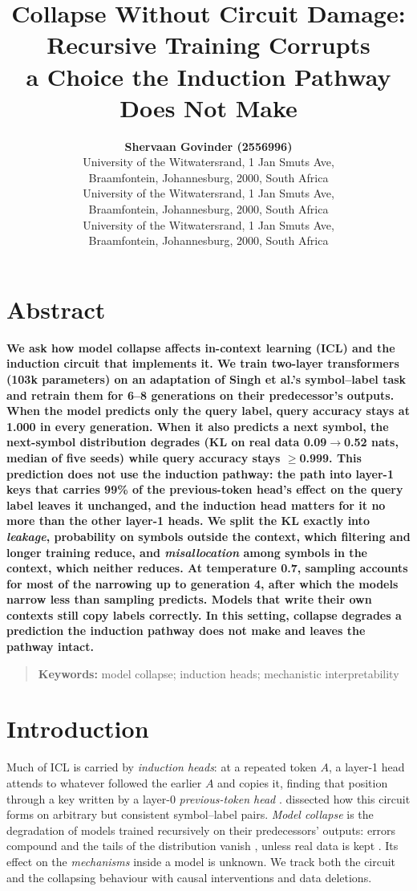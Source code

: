 \documentclass[10pt,letterpaper]{article}
\title{Collapse Without Circuit Damage: Recursive Training Corrupts\\a Choice the Induction Pathway Does Not Make}
\author{{\large \bf Shervaan Govinder (2556996)} \\ University of the Witwatersrand, 1 Jan Smuts Ave,\\ Braamfontein, Johannesburg, 2000, South Africa
  \AND {\large \bf Jaishil Patel (2602867)} \\ University of the Witwatersrand, 1 Jan Smuts Ave,\\ Braamfontein, Johannesburg, 2000, South Africa
  \AND {\large \bf Kovendan Jason Raman (2566527)} \\ University of the Witwatersrand, 1 Jan Smuts Ave,\\ Braamfontein, Johannesburg, 2000, South Africa}
\begin{document}
\maketitle
\phantom{.}
\newpage
\phantom{.}
\newpage
\section{Abstract}
{
\bf
{}
We ask how model collapse affects in-context learning (ICL) and the induction circuit that implements it. We train two-layer transformers (103k parameters) on an adaptation of Singh et al.'s symbol--label task and retrain them for 6--8 generations on their predecessor's outputs. When the model predicts only the query label, query accuracy stays at 1.000 in every generation. When it also predicts a next symbol, the next-symbol distribution degrades (KL on real data 0.09$\to$0.52 nats, median of five seeds) while query accuracy stays $\geq$0.999. This prediction does not use the induction pathway: the path into layer-1 keys that carries 99\% of the previous-token head's effect on the query label leaves it unchanged, and the induction head matters for it no more than the other layer-1 heads. We split the KL exactly into \emph{leakage}, probability on symbols outside the context, which filtering and longer training reduce, and \emph{misallocation} among symbols in the context, which neither reduces. At temperature 0.7, sampling accounts for most of the narrowing up to generation 4, after which the models narrow less than sampling predicts. Models that write their own contexts still copy labels correctly. In this setting, collapse degrades a prediction the induction pathway does not make and leaves the pathway intact.
}
\begin{quote}
\small
\textbf{Keywords:}
model collapse; induction heads; mechanistic interpretability
\end{quote}

\section{Introduction} \label{Intro}
Much of ICL is carried by \emph{induction heads}: at a repeated token $A$, a layer-1 head attends to whatever followed the earlier $A$ and copies it, finding that position through a key written by a layer-0 \emph{previous-token head} \citep{elhage2021mathematical,olsson2022context}. \citet{singh2024needs} dissected how this circuit forms on arbitrary but consistent symbol--label pairs. \emph{Model collapse} is the degradation of models trained recursively on their predecessors' outputs: errors compound and the tails of the distribution vanish \citep{shumailov2023curse,shumailov2024collapse}, unless real data is kept \citep{gerstgrasser2024inevitable}. Its effect on the \emph{mechanisms} inside a model is unknown. We track both the circuit and the collapsing behaviour with causal interventions \citep{conmy2023automated} and data deletions.
\end{document}
